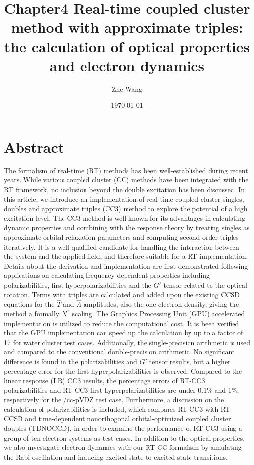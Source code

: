 \documentclass[journal=jctcce,manuscript=article]{achemso}
\title{Chapter4 Real-time coupled cluster method with approximate triples: the calculation of optical properties and electron dynamics}
\author{Zhe Wang}
\date{\today}
\begin{document}
\maketitle

\section{Abstract}
The formalism of real-time (RT) methods has been well-established during recent years. While various coupled cluster (CC) methods have been integrated with the RT framework, no inclusion beyond the double excitation has been discussed. In this article, we introduce an implementation of real-time coupled cluster singles, doubles and approximate triples (CC3) method to explore the potential of a high excitation level. The CC3 method is well-known for its advantages in calculating dynamic properties and combining with the response theory by treating singles as approximate orbital relaxation parameters and computing second-order triples iteratively.  It is a well-qualified candidate for handling the interaction between the system and the applied field, and therefore suitable for a RT implementation. Details about the derivation and implementation are first demonstrated following applications on calculating frequency-dependent properties including polarizabilities, first hyperpolarizabilities and the $G'$ tensor related to the optical rotation. Terms with triples are calculated and added upon the existing CCSD equations for the $\hat{T}$ and $\hat{\Lambda}$ amplitudes, also the one-electron density, giving the method a formally $N^{7}$ scaling. The Graphics Processing Unit (GPU) accelerated implementation is utilized to reduce the computational cost. It is been verified that the GPU implementation can speed up the calculation by up to a factor of 17 for water cluster test cases. Additionally, the single-precision arithmetic is used and compared to the conventional double-precision arithmetic. No significant difference is found in the polarizabilities and $G'$ tensor results, but a higher percentage error for the first hyperpolarizabilities is observed. Compared to the linear response (LR) CC3 results, the percentage errors of RT-CC3 polarizabilities and RT-CC3 first hyperpolarizabilities are under 0.1\% and 1\%, respectively for the /cc-pVDZ test case. Furthermore, a discussion on the calculation of polarizabilities is included, which compares RT-CC3 with RT-CCSD and time-dependent nonorthogonal orbital-optimized coupled cluster doubles (TDNOCCD), in order to examine the performance of RT-CC3 using a group of ten-electron systems as test cases. In addition to the optical properties, we also investigate electron dynamics with our RT-CC formalism by simulating the Rabi oscillation and inducing excited state to excited state transitions. 
\end{document}
